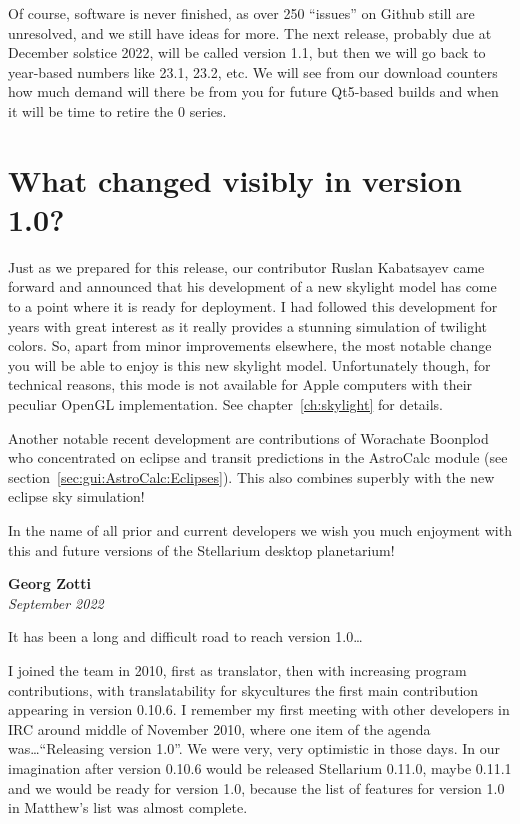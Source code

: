 Of course, software is never finished, as over 250 ``issues'' on
Github still are unresolved, and we still have ideas for more. The
next release, probably due at December solstice 2022, will be called
version 1.1, but then we will go back to year-based numbers like 23.1,
23.2, etc. We will see from our download counters how much demand will
there be from you for future Qt5-based builds and when it will be time to retire
the 0 series.


\section*{What changed visibly in version 1.0?}

Just as we prepared for this release, our contributor Ruslan
Kabatsayev came forward and announced that his development of a new skylight
model has come to a point where it is ready for deployment. I had
followed this development for years with great interest as it really
provides a stunning simulation of twilight colors. So, apart from minor
improvements elsewhere, the most notable change you will be able to
enjoy is this new skylight model. Unfortunately though, for technical
reasons, this mode is not available for Apple computers with their
peculiar OpenGL implementation.  See chapter~\ref{ch:skylight} for
details.

Another notable recent development are contributions of Worachate
Boonplod who concentrated on eclipse and transit predictions in the AstroCalc
module (see section~\ref{sec:gui:AstroCalc:Eclipses}).  This also
combines superbly with the new eclipse sky simulation!

\vspace{2\baselineskip}
\noindent In the name of all prior and current developers we wish you much enjoyment with
this and future versions of the Stellarium desktop planetarium!

\begin{flushright}
\textbf{Georg Zotti} \\ \emph{September 2022}
\end{flushright}

\vspace{2\baselineskip}

\noindent It has been a long and difficult road to reach version 1.0\ldots

I joined the team in 2010, first as translator, then with increasing
program contributions, with translatability for skycultures the first
main contribution appearing in version 0.10.6. I remember my first
meeting with other developers in IRC around middle of November 2010,
where one item of the agenda was\ldots ``Releasing version 1.0''. We were
very, very optimistic in those days. In our imagination after version
0.10.6 would be released Stellarium 0.11.0, maybe 0.11.1 and we would
be ready for version 1.0, because the list of features for version 1.0
in Matthew's list was almost complete.

